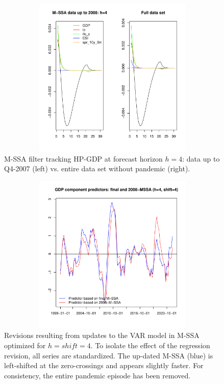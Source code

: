 \documentclass[11pt,a4paper]{article}
\begin{document}
\begin{figure}[h!]
    \begin{center}
        \includegraphics[height=3in, width=4.5in]{./Figures/bk_2008_all.pdf}
        \caption{M-SSA filter tracking HP-GDP at forecast horizon $h=4$: data up to Q4-2007 (left) vs. entire data set without pandemic (right).
        \label{bk_2008_all}}
    \end{center}
\end{figure}

\begin{figure}[h!]
    \begin{center}
        \includegraphics[height=3in, width=4.5in]{./Figures/revisions3.pdf}
        \caption{Revisions resulting from updates to the VAR model in M-SSA optimized for $h=shift=4$. To isolate the effect of the regression revision, all series are standardized. The up-dated M-SSA (blue) is left-shifted at the zero-crossings and appears slightly faster. For consistency, the entire pandemic episode has been removed.
        \label{revisions3}}
    \end{center}
\end{figure}
\end{document}
